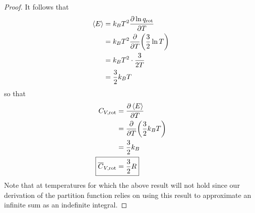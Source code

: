 \documentclass[../psets.tex]{subfiles}
\begin{document}
\begin{enumerate}
\begin{proof}
        It follows that
        \begin{align*}
            \left\langle{E}\right\rangle &= k_BT^2\pdv{\ln q_\text{rot}}{T}\\
            &= k_BT^2\pdv{T}(\frac{3}{2}\ln T)\\
            &= k_BT^2\cdot\frac{3}{2T}\\
            &= \frac{3}{2}k_BT
        \end{align*}
        so that
        \begin{align*}
            C_{V,\text{rot}} &= \pdv{\prb{E}}{T}\\
            &= \pdv{T}(\frac{3}{2}k_BT)\\
            &= \frac{3}{2}k_B\\
            \Aboxed{\overline{C}_{V,\text{rot}} &= \frac{3}{2}R}
        \end{align*}
        Note that at temperatures for which  the above result will not hold since our derivation of the partition function relies on using this result to approximate an infinite sum as an indefinite integral.
    \end{proof}
\end{enumerate}
\end{document}

